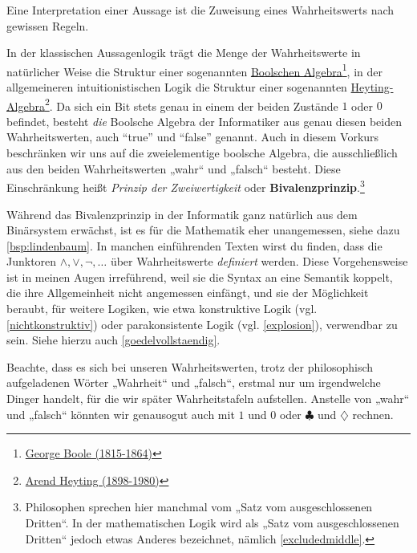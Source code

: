 \begin{vorschau}[Bivalenzprinzip] \label{bivalenz} 
    Eine Interpretation einer Aussage ist die Zuweisung eines Wahrheitswerts nach gewissen Regeln.

    In der klassischen Aussagenlogik trägt die Menge der Wahrheitswerte in natürlicher Weise die Struktur einer sogenannten \href{https://en.wikipedia.org/wiki/Boolean_algebra_(structure)}{Boolschen Algebra}\footnote{\href{https://de.wikipedia.org/wiki/George_Boole}{George Boole (1815-1864)}}, in der allgemeineren intuitionistischen Logik die Struktur einer sogenannten \href{https://ncatlab.org/nlab/show/Heyting+algebra}{Heyting-Algebra}\footnote{\href{https://de.wikipedia.org/wiki/Arend_Heyting}{Arend Heyting (1898-1980)}}. Da sich ein Bit stets genau in einem der beiden Zustände $1$ oder $0$ befindet, besteht \emph{die} Boolsche Algebra der Informatiker aus genau diesen beiden Wahrheitswerten, auch ``true'' und ``false'' genannt. Auch in diesem Vorkurs beschränken wir uns auf die zweielementige boolsche Algebra, die ausschließlich aus den beiden Wahrheitswerten „wahr“ und „falsch“ besteht. Diese Einschränkung heißt \emph{Prinzip der Zweiwertigkeit} oder \textbf{Bivalenzprinzip}.\footnote{Philosophen sprechen hier manchmal vom „Satz vom ausgeschlossenen Dritten“. In der mathematischen Logik wird als „Satz vom ausgeschlossenen Dritten“ jedoch etwas Anderes bezeichnet, nämlich \cref{excludedmiddle}.}
    
    Während das Bivalenzprinzip in der Informatik ganz natürlich aus dem Binärsystem erwächst, ist es für die Mathematik eher unangemessen, siehe dazu \cref{bsp:lindenbaum}. In manchen einführenden Texten wirst du finden, dass die Junktoren $\land,\lor,\neg,\dots$ über Wahrheitswerte \emph{definiert} werden. Diese Vorgehensweise ist in meinen Augen irreführend, weil sie die Syntax an eine Semantik koppelt, die ihre Allgemeinheit nicht angemessen einfängt, und sie der Möglichkeit beraubt, für weitere Logiken, wie etwa konstruktive Logik (vgl. \cref{nichtkonstruktiv}) oder parakonsistente Logik (vgl. \cref{explosion}), verwendbar zu sein. Siehe hierzu auch \cref{goedelvollstaendig}.

    Beachte, dass es sich bei unseren Wahrheitswerten, trotz der philosophisch aufgeladenen Wörter „Wahrheit“ und „falsch“, erstmal nur um irgendwelche Dinger handelt, für die wir später Wahrheitstafeln aufstellen. Anstelle von „wahr“ und „falsch“ könnten wir genausogut auch mit $1$ und $0$ oder $\clubsuit$ und $\diamondsuit$ rechnen.
\end{vorschau}


